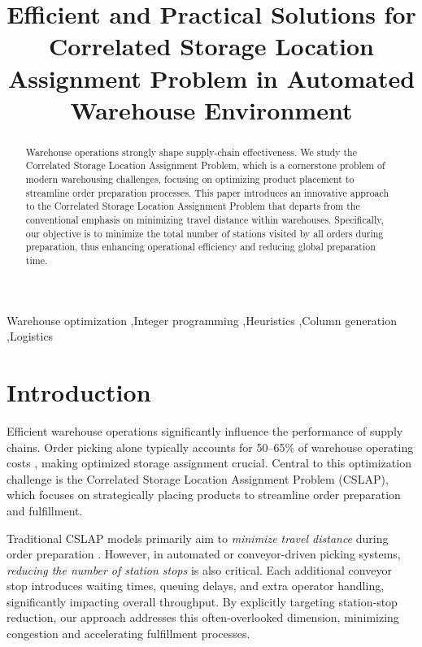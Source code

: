 \documentclass[11pt]{elsarticle}
\begin{document}
\begin{frontmatter}

\title{Efficient and Practical Solutions for Correlated Storage Location Assignment Problem in Automated Warehouse Environment}

\begin{abstract}
Warehouse operations strongly shape supply-chain effectiveness. We study the Correlated Storage Location Assignment Problem, which is a cornerstone problem of modern warehousing challenges, focusing on optimizing product placement to streamline order preparation processes. This paper introduces an innovative approach to the Correlated Storage Location Assignment Problem that departs from the conventional emphasis on minimizing travel distance within warehouses. Specifically, our objective is to minimize the total number of stations visited by all orders during preparation, thus enhancing operational efficiency and reducing global preparation time.
\end{abstract}

\begin{keyword}
Warehouse optimization \sep Integer programming \sep Heuristics \sep Column generation \sep Logistics
\end{keyword}

\end{frontmatter}
\clearpage


\section{Introduction}

Efficient warehouse operations significantly influence the performance of supply chains. Order picking alone typically accounts for 50--65\% of warehouse operating costs \cite{xie2024combi}, making optimized storage assignment crucial. Central to this optimization challenge is the Correlated Storage Location Assignment Problem (CSLAP), which focuses on strategically placing products to streamline order preparation and fulfillment.

Traditional CSLAP models primarily aim to \emph{minimize travel distance} during order preparation \cite{islam2023}. However, in automated or conveyor-driven picking systems, \emph{reducing the number of station stops} is also critical. Each additional conveyor stop introduces waiting times, queuing delays, and extra operator handling, significantly impacting overall throughput. By explicitly targeting station-stop reduction, our approach addresses this often-overlooked dimension, minimizing congestion and accelerating fulfillment processes.
\end{document}
